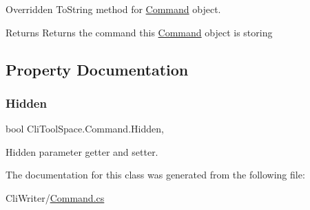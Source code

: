 Overridden To\+String method for \mbox{\hyperlink{class_cli_tool_space_1_1_command}{Command}} object. 

\begin{DoxyReturn}{Returns}
Returns the command this \mbox{\hyperlink{class_cli_tool_space_1_1_command}{Command}} object is storing
\end{DoxyReturn}


\subsection{Property Documentation}
\mbox{\label{class_cli_tool_space_1_1_command_a10f729897c950d77df6588c63845280b}} 
\subsubsection{\texorpdfstring{Hidden}{Hidden}}
{\footnotesize\ttfamily bool Cli\+Tool\+Space.\+Command.\+Hidden\hspace{0.3cm}{\ttfamily [get]}, {\ttfamily [set]}}



Hidden parameter getter and setter. 



The documentation for this class was generated from the following file\+:\begin{DoxyCompactItemize}
\item 
Cli\+Writer/\mbox{\hyperlink{_command_8cs}{Command.\+cs}}\end{DoxyCompactItemize}
